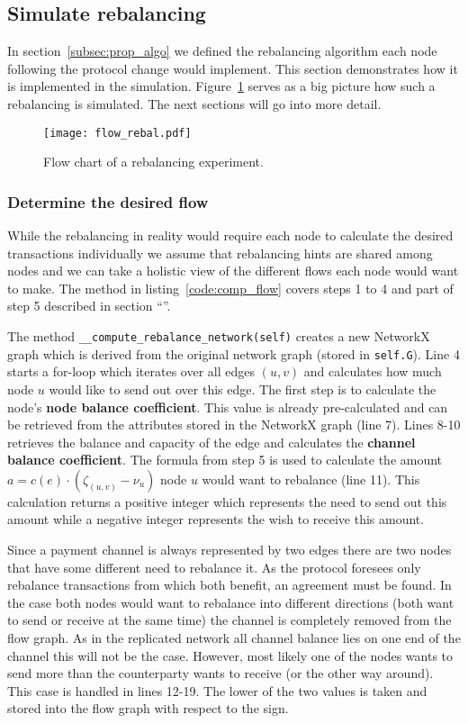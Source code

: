 \documentclass[final]{fhnwreport}       %
\begin{document}
\subsection{Simulate rebalancing}\label{subsec:sim_rebal}
In section~\ref{subsec:prop_algo} we defined the rebalancing algorithm each node following the protocol change would implement. This section demonstrates how it is implemented in the simulation. Figure~\ref{fig:flow_rebal} serves as a big picture how such a rebalancing is simulated. The next sections will go into more detail. 

\begin{figure}[H]
\centering
\texttt{[image: flow\_rebal.pdf]}
\caption{Flow chart of a rebalancing experiment.}
\label{fig:flow_rebal}
\end{figure}

\subsubsection{Determine the desired flow}\label{subsub:flow}
While the rebalancing in reality would require each node to calculate the desired transactions individually we assume that rebalancing hints are shared among nodes and we can take a holistic view of the different flows each node would want to make. The method in listing~\ref{code:comp_flow} covers steps 1 to 4 and part of step 5 described in section ``''.

The method \texttt{__compute_rebalance_network(self)} creates a new NetworkX graph which is derived from the original network graph (stored in \texttt{self.G}). Line 4 starts a for-loop which iterates over all edges $(u, v)$ and calculates how much node $u$ would like to send out over this edge. The first step is to calculate the node's \textbf{node balance coefficient}. This value is already pre-calculated and can be retrieved from the attributes stored in the NetworkX graph (line 7). Lines 8-10 retrieves the balance and capacity of the edge and calculates the \textbf{channel balance coefficient}. The formula from step 5 is used to calculate the amount $a = c(e)\cdot (\zeta_{(u,v)}-\nu_u)$ node $u$ would want to rebalance (line 11). This calculation returns a positive integer which represents the need to send out this amount while a negative integer represents the wish to receive this amount. 

Since a payment channel is always represented by two edges there are two nodes that have some different need to rebalance it. As the protocol foresees only rebalance transactions from which both benefit, an agreement must be found. In the case both nodes would want to rebalance into different directions (both want to send or receive at the same time) the channel is completely removed from the flow graph. As in the replicated network all channel balance lies on one end of the channel this will not be the case. However, most likely one of the nodes wants to send more than the counterparty wants to receive (or the other way around). This case is handled in lines 12-19. The lower of the two values is taken and stored into the flow graph with respect to the sign.
\end{document}
